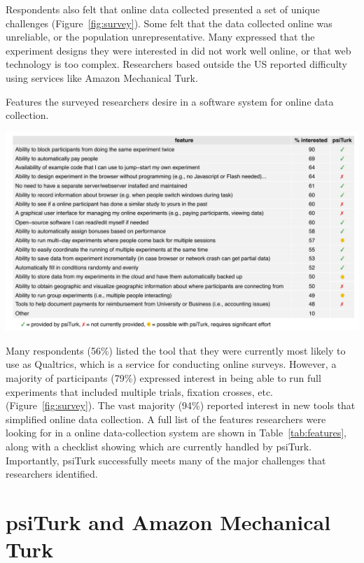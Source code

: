 \documentclass[twocolumn]{svjour3}          %
\newcommand{\psiturk}[0]{\textsf{psiTurk}}
\begin{document}
Respondents also felt that online data collected presented a set of unique challenges 
(Figure~\ref{fig:survey}).  Some felt that the data collected online was unreliable, or the
population unrepresentative. Many expressed that the experiment designs they were interested in did
not work well online, or that web technology is too complex. Researchers based
outside the US reported difficulty using services like Amazon Mechanical Turk.

\begin{table}[tp]
\centering
\caption{Features the surveyed researchers desire in a software system for online data collection.}
\includegraphics[width=\textwidth]{figures/featuresTable.pdf}
\label{tab:features}
\end{table}

Many respondents (56\%) listed the tool that they were currently most likely to use as Qualtrics, which is a service for conducting online surveys. However, a majority of participants (79\%) expressed interest in 
being able to run full experiments that included multiple trials, fixation crosses, etc.
(Figure~\ref{fig:survey}). The vast majority (94\%) reported interest in new tools that 
simplified online data collection. A full list of the features researchers were looking for in a 
online data-collection system are shown in Table~\ref{tab:features}, along with a checklist 
showing which are currently handled by \psiturk{}.  Importantly, \psiturk{} successfully
meets many of the major challenges that researchers identified.


\section{\psiturk{} and Amazon Mechanical Turk} 
\end{document}
